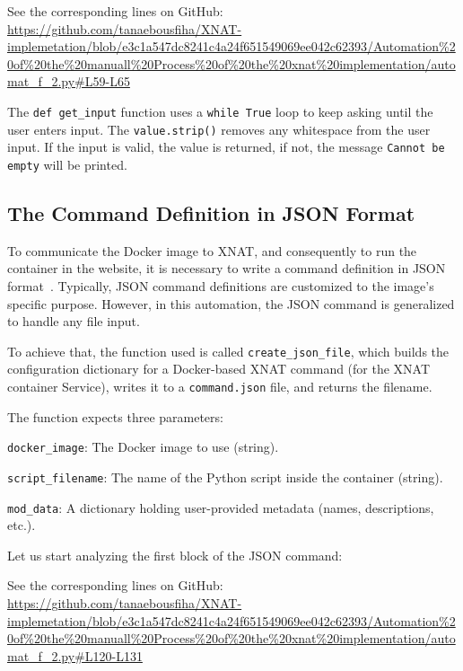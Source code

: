 \noindent\footnotesize See the corresponding lines on GitHub:\url{ https://github.com/tanaebousfiha/XNAT-implemetation/blob/e3c1a547dc8241c4a24f651549069ee042c62393/Automation%20of%20the%20manuall%20Process%20of%20the%20xnat%20implementation/automat_f_2.py#L59-L65}
\normalsize

The \texttt{def get\_input} function uses a \texttt{while True} loop to keep asking until the user enters input. The \texttt{value.strip()} removes any whitespace from the user input. If the input is valid, the value is returned, if not, the message \texttt{Cannot be empty} will be printed.

\subsection{The Command Definition in JSON Format}

To communicate the Docker image to XNAT, and consequently to run the container in the website, it is necessary to write a command definition in JSON format~\cite{JSONCommand}.
Typically, JSON command definitions are customized to the image's specific purpose. However, in this automation, the JSON command is generalized to handle any file input.

To achieve that, the function used is called \texttt{create\_json\_file}, which builds the configuration dictionary for a Docker-based XNAT command (for the XNAT container Service), writes it to a \texttt{command.json} file, and returns the filename.

The function expects three parameters:

\texttt{docker\_image}: The Docker image to use (string).

\texttt{script\_filename}: The name of the Python script inside the container (string).

\texttt{mod\_data}: A dictionary holding user-provided metadata (names, descriptions, etc.).

Let us start analyzing the first block of the JSON command:





\noindent\footnotesize See the corresponding lines on GitHub:\url{ https://github.com/tanaebousfiha/XNAT-implemetation/blob/e3c1a547dc8241c4a24f651549069ee042c62393/Automation%20of%20the%20manuall%20Process%20of%20the%20xnat%20implementation/automat_f_2.py#L120-L131}
\normalsize


